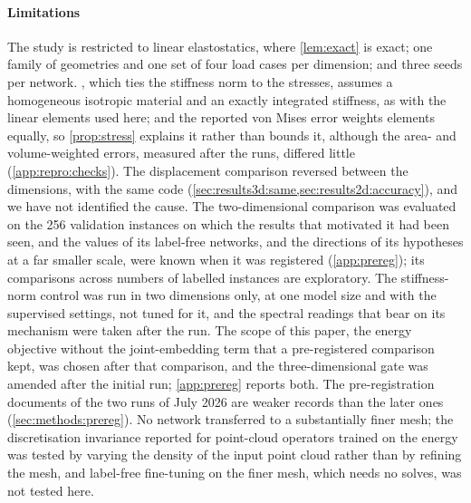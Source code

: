 \paragraph{Limitations}
The study is restricted to linear elastostatics, where \cref{lem:exact} is exact; one
family of geometries and one set of four load cases per dimension; and three seeds per
network. , which ties the stiffness norm to the stresses, assumes a
homogeneous isotropic material and an exactly integrated stiffness, as with the linear
elements used here; and the reported von Mises error weights elements equally, so
\cref{prop:stress} explains it rather than bounds it, although the area- and
volume-weighted errors, measured after the runs, differed little (\ref{app:repro:checks}).
The displacement comparison reversed between the dimensions, with the same code
(\cref{sec:results3d:same,sec:results2d:accuracy}), and we have not identified the cause.
The two-dimensional comparison was evaluated on
the 256 validation instances on which the results that motivated it had been seen, and the
values of its label-free networks, and the directions of its hypotheses at a far smaller
scale, were known when it was registered (\ref{app:prereg}); its comparisons across numbers
of labelled instances are exploratory. The stiffness-norm control was run in two dimensions
only, at one model size and with the supervised settings, not tuned for it, and the
spectral readings that bear on its mechanism were taken after the run. The scope of this
paper, the energy objective without the joint-embedding term that a pre-registered
comparison kept, was chosen after that comparison, and the three-dimensional gate was
amended after the initial run; \ref{app:prereg} reports both. The pre-registration documents
of the two runs of July 2026 are weaker records than the later ones
(\cref{sec:methods:prereg}). No network transferred to a substantially finer mesh; the
discretisation invariance reported for point-cloud operators trained on the energy
\cite{Wang2026PretrainFEM,Sun2026FEVessel} was tested by varying the density of the input
point cloud rather than by refining the mesh, and label-free fine-tuning on the finer mesh,
which needs no solves, was not
tested here.

